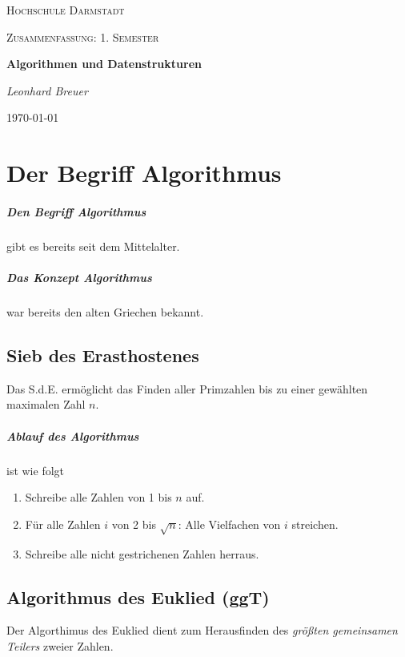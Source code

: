 \documentclass{book}
\begin{document}
\begin{titlepage}
    \centering
	{\LARGE \textsc{Hochschule Darmstadt}\par}
	\vspace{1cm}
	{\Large \textsc{Zusammenfassung: 1. Semester}\par}
	\vspace{1.5cm}
	{\huge\bfseries Algorithmen und Datenstrukturen\par}
	\vspace{2cm}
	{\Large\itshape Leonhard Breuer\par}

	{\large \today\par}
\end{titlepage}
\tableofcontents

\chapter{Der Begriff Algorithmus}
\paragraph{Den Begriff Algorithmus} gibt es bereits seit dem Mittelalter.
\paragraph{Das Konzept Algorithmus} war bereits den alten Griechen bekannt.

\section{Sieb des Erasthostenes}
Das S.d.E. ermöglicht das Finden aller Primzahlen bis zu einer gewählten maximalen Zahl $n$.
\paragraph*{Ablauf des Algorithmus} ist wie folgt
\begin{enumerate}
	\item Schreibe alle Zahlen von 1 bis $n$ auf.
	\item Für alle Zahlen $i$ von 2 bis $\sqrt{n}$: Alle Vielfachen von $i$ streichen.
	\item Schreibe alle nicht gestrichenen Zahlen herraus.
\end{enumerate}
\section{Algorithmus des Euklied (ggT)}
Der Algorthimus des Euklied dient zum Herausfinden des \textit{größten gemeinsamen Teilers} zweier Zahlen.
\end{document}
